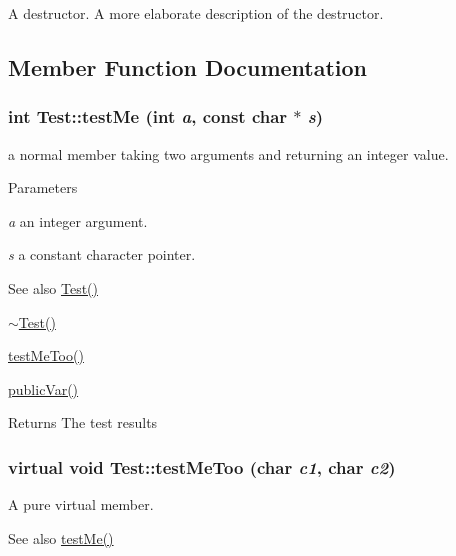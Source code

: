 A destructor. A more elaborate description of the destructor. 

\subsection{Member Function Documentation}
\hypertarget{classTest_af7115d71dda64654a7104c24f130e8d0}{
\subsubsection[{testMe}]{\setlength{\rightskip}{0pt plus 5cm}int Test::testMe (int {\em a}, \/  const char $\ast$ {\em s})}}
\label{classTest_af7115d71dda64654a7104c24f130e8d0}


a normal member taking two arguments and returning an integer value. 
\begin{DoxyParams}{Parameters}
\item[{\em a}]an integer argument. \item[{\em s}]a constant character pointer. \end{DoxyParams}
\begin{DoxySeeAlso}{See also}
\hyperlink{classTest_a99f2bbfac6c95612322b0f10e607ebe5}{Test()} 

\hyperlink{classTest_a2b0a62f1e667bbe8d8cb18d785bfa991}{$\sim$Test()} 

\hyperlink{classTest_a3edb9fdc1e9f0d5274b57386ab03704c}{testMeToo()} 

\hyperlink{classTest_a3085f973ef857d85d647bf04e89760d0}{publicVar()} 
\end{DoxySeeAlso}
\begin{DoxyReturn}{Returns}
The test results 
\end{DoxyReturn}
\hypertarget{classTest_a3edb9fdc1e9f0d5274b57386ab03704c}{
\subsubsection[{testMeToo}]{\setlength{\rightskip}{0pt plus 5cm}virtual void Test::testMeToo (char {\em c1}, \/  char {\em c2})}}
\label{classTest_a3edb9fdc1e9f0d5274b57386ab03704c}


A pure virtual member. \begin{DoxySeeAlso}{See also}
\hyperlink{classTest_af7115d71dda64654a7104c24f130e8d0}{testMe()} 
\end{DoxySeeAlso}

